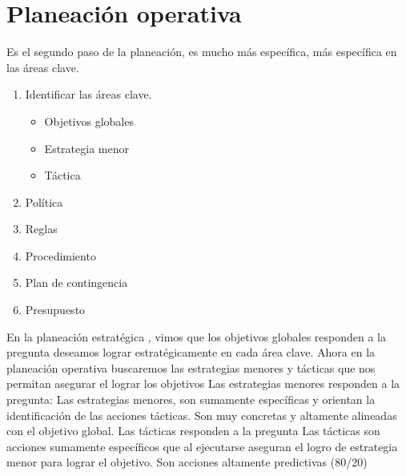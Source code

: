 \section{Planeación operativa}
Es el segundo paso de la planeación, es mucho más específica, más específica en las áreas clave. 
\begin{enumerate}
    \item Identificar las áreas clave.
        \begin{itemize}
            \item Objetivos globales 
            \item Estrategia menor 
            \item Táctica 
        \end{itemize}
    
    \item Política 
    \item Reglas 
    \item Procedimiento 
    \item Plan de contingencia 
    \item Presupuesto 
\end{enumerate}

En la planeación estratégica , vimos que los objetivos globales responden a la pregunta  deseamos lograr estratégicamente en cada área clave. Ahora en la planeación operativa buscaremos las estrategias menores y tácticas que nos permitan asegurar el lograr los objetivos 
\newline \newline 
Las estrategias menores responden a la pregunta:  Las estrategias menores, son sumamente específicas y orientan la identificación de las acciones tácticas. Son muy concretas y altamente alineadas con el objetivo global. \newline \newline 
Las tácticas responden a la pregunta  Las tácticas son acciones sumamente específicos que al ejecutarse aseguran el logro de estrategia menor para lograr el objetivo. Son acciones altamente predictivas (80/20)
\newline \newline 

